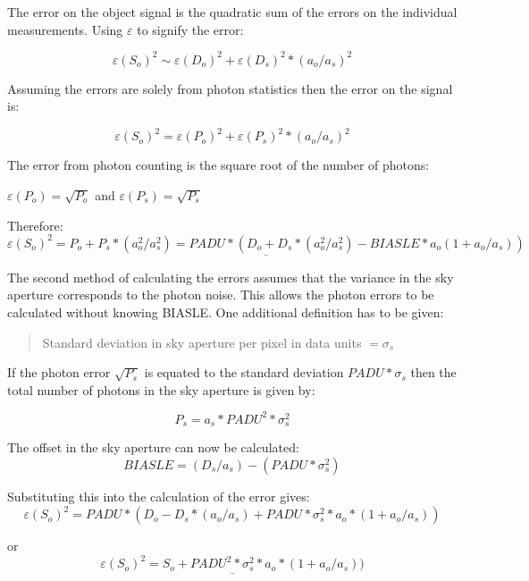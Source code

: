 \documentclass[twoside,11pt]{article}
\renewcommand{\_}{\texttt{\symbol{95}}}
\begin{document}
The error on the object signal is the quadratic sum of the errors on the
individual measurements. Using $\varepsilon$ to signify the error:

\[\varepsilon( S_o )^2 \sim \varepsilon( D_o )^2 + \varepsilon( D_s )^2 *
( a_o / a_s )^2\]

Assuming the errors are solely from photon statistics then the error on
the signal is:

\[\varepsilon( S_o )^2 = \varepsilon( P_o )^2 + \varepsilon( P_s )^2 *
( a_o / a_s )^2\]

The error from photon counting is the square root of the number of photons:

\begin{center}
$\varepsilon( P_o ) = \sqrt{ P_o }$ and $\varepsilon( P_s ) = \sqrt{ P_s }$
\end{center}

Therefore:
\begin{equation}\underline{
\varepsilon( S_o )^2 = P_o + P_s * ( a_o^2 / a_s^2 )
                      = PADU * ( D_o + D_s *( a_o^2 / a_s^2 ) -
                        BIASLE * a_o ( 1 + a_o / a_s ) )}\end{equation}


The second method of calculating the errors assumes that the variance in
the sky aperture corresponds to the photon noise. This allows the photon
errors to be calculated without knowing BIASLE. One additional definition
has to be given:

\begin{quote}
Standard deviation in sky aperture per pixel in data units $=\sigma_s$
\end{quote}

If the photon error $\sqrt{P_s}$ is equated to the standard deviation
$PADU * \sigma_s$ then the total number of photons in the sky aperture is
given by:

\[P_s = a_s * PADU^2 * \sigma_s^2\]

The offset in the sky aperture can now be calculated:
\[BIASLE = ( D_s / a_s ) - ( PADU * \sigma_s^2 )\]

Substituting this into the calculation of the error gives:
\[\varepsilon( S_o )^2 = PADU * ( D_o - D_s * ( a_o / a_s ) +
                         PADU * \sigma_s^2 * a_o * ( 1 + a_o / a_s ) )\]

or
\begin{equation}\underline{
\varepsilon( S_o )^2 = S_o + PADU^2 * \sigma_s^2 * a_o * ( 1 + a_o / a_s ) )
}\end{equation}
\end{document}
